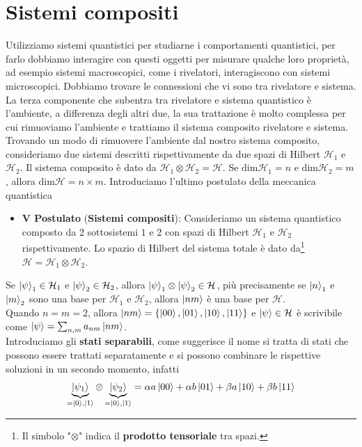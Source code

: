 \section{Sistemi compositi}
Utilizziamo sistemi quantistici per studiarne i comportamenti quantistici, per farlo dobbiamo interagire con questi oggetti per misurare qualche loro proprietà, ad esempio sistemi macroscopici, come i rivelatori, interagiscono con sistemi microscopici. Dobbiamo trovare le connessioni che vi sono tra rivelatore e sistema. La terza componente che subentra tra rivelatore e sistema quantistico è l'ambiente, a differenza degli altri due, la sua trattazione è molto complessa per cui rimuoviamo l'ambiente e trattiamo il sistema composito rivelatore e sistema. \\
Trovando un modo di rimuovere l'ambiente dal nostro sistema composito, consideriamo due sistemi descritti rispettivamente da due spazi di Hilbert $\mathcal{H}_1$ e $\mathcal{H}_2$. Il sistema composito è dato da $\mathcal{H}_1\otimes\mathcal{H}_2=\mathcal{H}$. Se $\text{dim}\mathcal{H}_1 = n$ e $\text{dim}\mathcal{H}_2 = m$, allora $\text{dim}\mathcal{H} = n\times m$. Introduciamo l'ultimo postulato della meccanica quantistica
\begin{itemize}
    \item \textbf{V Postulato} (\textbf{Sistemi compositi}): Consideriamo un sistema quantistico composto da 2 sottosistemi $1$ e $2$ con spazi di Hilbert $\mathcal{H}_1$ e $\mathcal{H}_2$ rispettivamente. Lo spazio di Hilbert del sistema totale è dato da\footnote{Il simbolo "$\otimes$" indica il \textbf{prodotto tensoriale} tra spazi.} $\mathcal{H} = \mathcal{H}_1 \otimes \mathcal{H}_2$.
\end{itemize}
Se $\ket{\psi}_1\in\mathcal{H}_1$ e $\ket{\psi}_2\in\mathcal{H}_2$, allora $\ket{\psi}_1\otimes\ket{\psi}_2\in\mathcal{H}$, più precisamente se $\ket{n}_1$ e $\ket{m}_2$ sono una base per $\mathcal{H}_1$ e $\mathcal{H}_2$, allora $\ket{nm}$ è una base per $\mathcal{H}$. \\
Quando $n=m=2$, allora $\ket{nm}=\{\ket{00}, \ket{01}, \ket{10}, \ket{11}\}$ e $\ket \psi \in \mathcal{H}$ è scrivibile come $\ket{\psi}=\sum_{n,m}a_{nm}\ket{nm}$. \\
Introduciamo gli \textbf{stati separabili}, come suggerisce il nome si tratta di stati che possono essere trattati separatamente e si possono combinare le rispettive soluzioni in un secondo momento, infatti
\begin{equation*}
    \underbrace{\ket{\psi_1}}_{= \ket 0, \ket 1}\otimes\underbrace{\ket{\psi_2}}_{= \ket 0, \ket 1}=\alpha a \ket{00} + \alpha b \ket{01} + \beta a \ket{10} + \beta b \ket{11}
\end{equation*}
